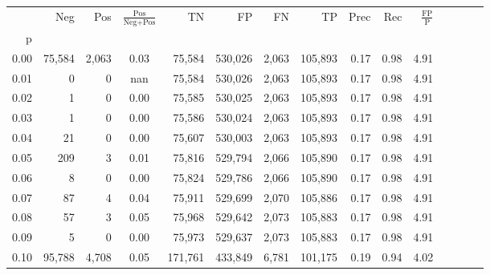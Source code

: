 \begin{tabular}{rrrcrrrrrrrrrrr}
\toprule
{} &     Neg &     Pos & $\frac{\text{Pos}}{\text{Neg}+\text{Pos}}$ &       TN &       FP &       FN &       TP &  Prec &   Rec & $\frac{\text{FP}}{\text{P}}$ \\
p    &         &         &                                            &          &          &          &          &       &       &                              \\
\midrule
0.00 &  75,584 &   2,063 &                                       0.03 &   75,584 &  530,026 &    2,063 &  105,893 &  0.17 &  0.98 &                         4.91 \\
0.01 &       0 &       0 &                                        nan &   75,584 &  530,026 &    2,063 &  105,893 &  0.17 &  0.98 &                         4.91 \\
0.02 &       1 &       0 &                                       0.00 &   75,585 &  530,025 &    2,063 &  105,893 &  0.17 &  0.98 &                         4.91 \\
0.03 &       1 &       0 &                                       0.00 &   75,586 &  530,024 &    2,063 &  105,893 &  0.17 &  0.98 &                         4.91 \\
0.04 &      21 &       0 &                                       0.00 &   75,607 &  530,003 &    2,063 &  105,893 &  0.17 &  0.98 &                         4.91 \\
0.05 &     209 &       3 &                                       0.01 &   75,816 &  529,794 &    2,066 &  105,890 &  0.17 &  0.98 &                         4.91 \\
0.06 &       8 &       0 &                                       0.00 &   75,824 &  529,786 &    2,066 &  105,890 &  0.17 &  0.98 &                         4.91 \\
0.07 &      87 &       4 &                                       0.04 &   75,911 &  529,699 &    2,070 &  105,886 &  0.17 &  0.98 &                         4.91 \\
0.08 &      57 &       3 &                                       0.05 &   75,968 &  529,642 &    2,073 &  105,883 &  0.17 &  0.98 &                         4.91 \\
0.09 &       5 &       0 &                                       0.00 &   75,973 &  529,637 &    2,073 &  105,883 &  0.17 &  0.98 &                         4.91 \\
0.10 &  95,788 &   4,708 &                                       0.05 &  171,761 &  433,849 &    6,781 &  101,175 &  0.19 &  0.94 &                         4.02 \\

\end{tabular}
